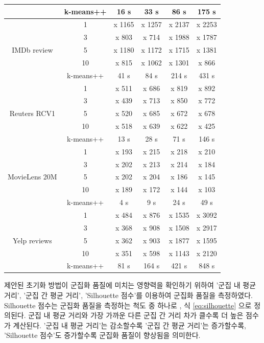 \documentclass[11pt]{article}
\begin{document}
\begin{table}[H]
\begin{tabular}{|c|c|c|c|c|c|}
 & k-means++ & 16 s & 33 s & 86 s & 175 s \\ \hline
\multirow{5}{*}{IMDb review} & 1 & x 1165 & x 1257 & x 2137 & x 2253 \\ \cline{2-6} 
 & 3 & x 803 & x 714 & x 1988 & x 1787 \\ \cline{2-6} 
 & 5 & x 1180 & x 1172 & x 1715 & x 1381 \\ \cline{2-6} 
 & 10 & x 815 & x 1062 & x 1301 & x 866 \\ \cline{2-6} 
 & k-means++ & 41 s & 84 s & 214 s & 431 s \\ \hline
\multirow{5}{*}{Reuters RCV1} & 1 & x 511 & x 686 & x 819 & x 892 \\ \cline{2-6} 
 & 3 & x 439 & x 713 & x 850 & x 772 \\ \cline{2-6} 
 & 5 & x 520 & x 685 & x 672 & x 678 \\ \cline{2-6} 
 & 10 & x 518 & x 639 & x 622 & x 425 \\ \cline{2-6} 
 & k-means++ & 13 s & 28 s & 71 s & 146 s \\ \hline
\multirow{5}{*}{MovieLens 20M} & 1 & x 193 & x 215 & x 218 & x 210 \\ \cline{2-6} 
 & 3 & x 202 & x 213 & x 214 & x 184 \\ \cline{2-6} 
 & 5 & x 202 & x 204 & x 186 & x 145 \\ \cline{2-6} 
 & 10 & x 189 & x 172 & x 144 & x 103 \\ \cline{2-6} 
 & k-means++ & 4 s & 9 s & 24 s & 49 s \\ \hline
\multirow{5}{*}{Yelp reviews} & 1 & x 484 & x 876 & x 1535 & x 3092 \\ \cline{2-6} 
 & 3 & x 368 & x 908 & x 1508 & x 2917 \\ \cline{2-6} 
 & 5 & x 362 & x 903 & x 1877 & x 1595 \\ \cline{2-6} 
 & 10 & x 351 & x 598 & x 1143 & x 2120 \\ \cline{2-6} 
 & k-means++ & 81 s & 164 s & 421 s & 848 s \\ \hline
\end{tabular}
\end{table}

제안된 초기화 방법이 군집화 품질에 미치는 영향력을 확인하기 위하여 '군집 내 평균 거리', '군집 간 평균 거리', 'Silhouette 점수'를 이용하여 군집화 품질을 측정하였다.
Silhouette 점수는 군집화 품질을 측정하는 척도 중 하나로 \citep{rousseeuw1987silhouettes, lewis2012human}, 식 \ref{eq:silhouette} 으로 정의된다.
군집 내 평균 거리와 가장 가까운 다른 군집 간 거리 차가 클수록 더 높은 점수가 계산된다.
'군집 내 평균 거리'는 감소할수록 '군집 간 평균 거리'는 증가할수록, 'Silhouette 점수'도 증가할수록 군집화 품질이 향상됨을 의미한다.
\end{document}
